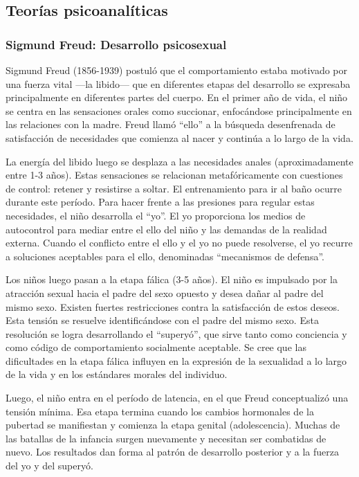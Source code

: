 \documentclass[11pt,letterpaper]{report}
\begin{document}
\subsection{Teorías psicoanalíticas}
\subsubsection{Sigmund Freud: Desarrollo psicosexual}
Sigmund Freud (1856-1939) postuló que el comportamiento estaba motivado por una
fuerza vital —la libido— que en diferentes etapas del desarrollo se expresaba
principalmente en diferentes partes del cuerpo. En el primer año de vida, el
niño se centra en las sensaciones orales como succionar, enfocándose
principalmente en las relaciones con la madre. Freud llamó ``ello'' a la
búsqueda desenfrenada de satisfacción de necesidades que comienza al nacer y
continúa a lo largo de la vida. \cite{Feldman3}

La energía del libido luego se desplaza a las necesidades anales
(aproximadamente entre 1-3 años). Estas sensaciones se relacionan
metafóricamente con cuestiones de control: retener y resistirse a soltar. El
entrenamiento para ir al baño ocurre durante este período. Para hacer frente a
las presiones para regular estas necesidades, el niño desarrolla el ``yo''. El
yo proporciona los medios de autocontrol para mediar entre el ello del niño y
las demandas de la realidad externa. Cuando el conflicto entre el ello y el yo
no puede resolverse, el yo recurre a soluciones aceptables para el ello,
denominadas ``mecanismos de defensa''. \cite{Feldman3}

Los niños luego pasan a la etapa fálica (3-5 años). El niño es impulsado por la
atracción sexual hacia el padre del sexo opuesto y desea dañar al padre del
mismo sexo. Existen fuertes restricciones contra la satisfacción de estos
deseos. Esta tensión se resuelve identificándose con el padre del mismo sexo.
Esta resolución se logra desarrollando el ``superyó'', que sirve tanto como
conciencia y como código de comportamiento socialmente aceptable. Se cree que
las dificultades en la etapa fálica influyen en la expresión de la sexualidad a
lo largo de la vida y en los estándares morales del individuo. \cite{Feldman3}

Luego, el niño entra en el período de latencia, en el que Freud conceptualizó
una tensión mínima. Esa etapa termina cuando los cambios hormonales de la
pubertad se manifiestan y comienza la etapa genital (adolescencia). Muchas de
las batallas de la infancia surgen nuevamente y necesitan ser combatidas de
nuevo. Los resultados dan forma al patrón de desarrollo posterior y a la fuerza
del yo y del superyó. \cite{Feldman3}
\end{document}
